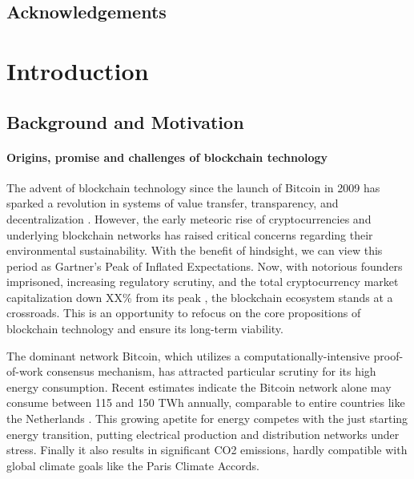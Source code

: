 \documentclass[11pt]{report}
\begin{document}

\newpage
\section*{Acknowledgements}
\tableofcontents



\chapter{Introduction}

\section{Background and Motivation}
\subsubsection*{Origins, promise and challenges of blockchain technology}
The advent of blockchain technology since the launch of Bitcoin in 2009 has sparked a revolution in systems of value transfer, transparency, and decentralization \cite{nakamotoBitcoinPeertopeerElectronic2008}. However, the early meteoric rise of cryptocurrencies and underlying blockchain networks has raised critical concerns regarding their environmental sustainability. With the benefit of hindsight, we can view this period as Gartner's Peak of Inflated Expectations. Now, with notorious founders imprisoned, increasing regulatory scrutiny, and the total cryptocurrency market capitalization down 
XX\% from its peak , 
the blockchain ecosystem stands at a crossroads. This is an opportunity to refocus on the core propositions of blockchain technology and ensure its long-term viability.


The dominant network Bitcoin, which utilizes a computationally-intensive proof-of-work consensus mechanism, has attracted particular scrutiny for its high energy consumption. Recent estimates indicate the Bitcoin network alone may consume between 115 and 150 TWh annually, comparable to entire countries like the Netherlands \cite{devriesRevisitingBitcoinCarbon2022,neumuellerCambridgeBitcoinElectricity2021}. This growing apetite for energy competes with the just starting energy transition, putting electrical production and distribution networks under stress. Finally it also results in significant CO2 emissions, hardly compatible with global climate goals like the Paris Climate Accords.
\end{document}
